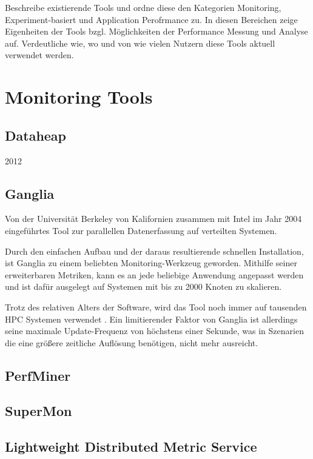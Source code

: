 
\par Beschreibe existierende Tools und ordne diese den Kategorien Monitoring, Experiment-basiert und Application Perofrmance zu. In diesen Bereichen zeige Eigenheiten der Tools bzgl. Möglichkeiten der Performance Messung und Analyse auf. Verdeutliche wie, wo und von wie vielen Nutzern diese Tools aktuell verwendet werden. 



\section{Monitoring Tools}

\subsection{Dataheap}
2012


\subsection{Ganglia}
Von der Universität Berkeley von Kalifornien zusammen mit Intel im Jahr 2004 eingeführtes Tool zur parallellen Datenerfassung auf verteilten Systemen.


\par Durch den einfachen Aufbau und der daraus resultierende schnellen Installation, ist Ganglia zu einem beliebten Monitoring-Werkzeug geworden. Mithilfe seiner erweiterbaren Metriken, kann es an jede beliebige Anwendung angepasst werden und ist dafür ausgelegt auf Systemen mit bis zu 2000 Knoten zu skalieren. 
\par Trotz des relativen Alters der Software, wird das Tool noch immer auf tausenden HPC Systemen verwendet \cite{GangliaWebsite}. Ein limitierender Faktor von Ganglia ist allerdings seine maximale Update-Frequenz von höchstens einer Sekunde, was in Szenarien die eine größere zeitliche Auflösung benötigen, nicht mehr ausreicht.



\subsection{PerfMiner}

\subsection{SuperMon}

\subsection{Lightweight Distributed Metric Service}

